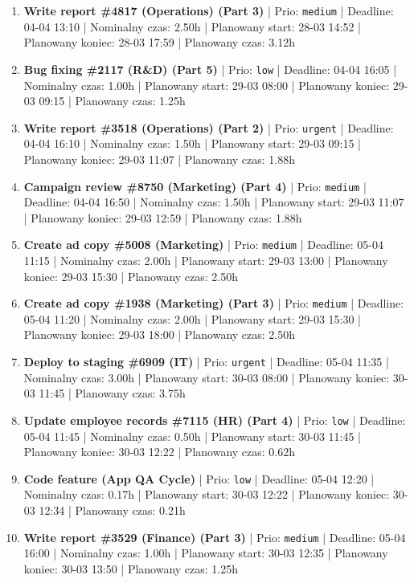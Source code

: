 {\begin{enumerate}
  \item [\textbf{14639}] \textbf{Write report \#4817 (Operations) (Part 3)} | Prio: \texttt{medium} | Deadline: 04-04 13:10 | Nominalny czas: 2.50h | Planowany start: 28-03 14:52 | Planowany koniec: 28-03 17:59 | Planowany czas: 3.12h
  \item [\textbf{14689}] \textbf{Bug fixing \#2117 (R\&D) (Part 5)} | Prio: \texttt{low} | Deadline: 04-04 16:05 | Nominalny czas: 1.00h | Planowany start: 29-03 08:00 | Planowany koniec: 29-03 09:15 | Planowany czas: 1.25h
  \item [\textbf{14598}] \textbf{Write report \#3518 (Operations) (Part 2)} | Prio: \texttt{urgent} | Deadline: 04-04 16:10 | Nominalny czas: 1.50h | Planowany start: 29-03 09:15 | Planowany koniec: 29-03 11:07 | Planowany czas: 1.88h
  \item [\textbf{14632}] \textbf{Campaign review \#8750 (Marketing) (Part 4)} | Prio: \texttt{medium} | Deadline: 04-04 16:50 | Nominalny czas: 1.50h | Planowany start: 29-03 11:07 | Planowany koniec: 29-03 12:59 | Planowany czas: 1.88h
  \item [\textbf{14666}] \textbf{Create ad copy \#5008 (Marketing)} | Prio: \texttt{medium} | Deadline: 05-04 11:15 | Nominalny czas: 2.00h | Planowany start: 29-03 13:00 | Planowany koniec: 29-03 15:30 | Planowany czas: 2.50h
  \item [\textbf{14652}] \textbf{Create ad copy \#1938 (Marketing) (Part 3)} | Prio: \texttt{medium} | Deadline: 05-04 11:20 | Nominalny czas: 2.00h | Planowany start: 29-03 15:30 | Planowany koniec: 29-03 18:00 | Planowany czas: 2.50h
  \item [\textbf{14597}] \textbf{Deploy to staging \#6909 (IT)} | Prio: \texttt{urgent} | Deadline: 05-04 11:35 | Nominalny czas: 3.00h | Planowany start: 30-03 08:00 | Planowany koniec: 30-03 11:45 | Planowany czas: 3.75h
  \item [\textbf{14701}] \textbf{Update employee records \#7115 (HR) (Part 4)} | Prio: \texttt{low} | Deadline: 05-04 11:45 | Nominalny czas: 0.50h | Planowany start: 30-03 11:45 | Planowany koniec: 30-03 12:22 | Planowany czas: 0.62h
  \item [\textbf{14703}] \textbf{Code feature (App QA Cycle)} | Prio: \texttt{low} | Deadline: 05-04 12:20 | Nominalny czas: 0.17h | Planowany start: 30-03 12:22 | Planowany koniec: 30-03 12:34 | Planowany czas: 0.21h
  \item [\textbf{14672}] \textbf{Write report \#3529 (Finance) (Part 3)} | Prio: \texttt{medium} | Deadline: 05-04 16:00 | Nominalny czas: 1.00h | Planowany start: 30-03 12:35 | Planowany koniec: 30-03 13:50 | Planowany czas: 1.25h

\end{enumerate}}

